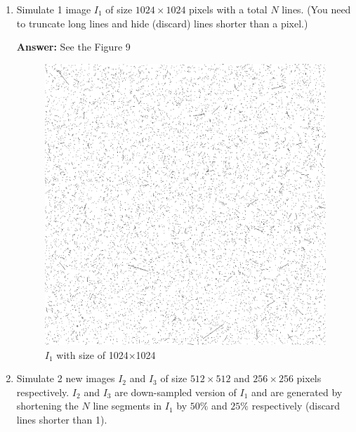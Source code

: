 \documentclass[11pt]{article}
\newcommand{\Answer}{\color{red}\textbf{Answer:} \color{black}}
\begin{document}
\begin{enumerate}
\item Simulate 1 image $I_1$ of size $1024 \times 1024$ pixels
with a total $N$ lines. (You need to truncate long lines and hide (discard) lines shorter than a pixel.)

\Answer See the Figure 9
\begin{figure}[h]
    \centering
    \includegraphics[scale=0.25]{pro3_result/1024.png}
    \caption{$I_1$ with size of 1024$\times$1024}
\end{figure}

\item Simulate 2 new images $I_2$ and $I_3$ of size $512 \times 512$ and $256 \times 256$ pixels respectively. $I_2$ and $I_3$ are down-sampled version of $I_1$ and are generated by shortening the $N$ line segments in $I_1$ by $50\%$ and $25\%$ respectively (discard lines shorter than 1).


\end{enumerate}
\end{document}
